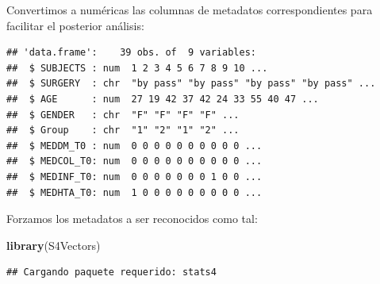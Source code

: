 \documentclass[
]{article}
\newenvironment{Shaded}{\begin{snugshade}}{\end{snugshade}}
\newcommand{\FunctionTok}[1]{\textcolor[rgb]{0.13,0.29,0.53}{\textbf{#1}}}
\newcommand{\NormalTok}[1]{#1}
\newcommand{\OtherTok}[1]{\textcolor[rgb]{0.56,0.35,0.01}{#1}}
\newcommand{\SpecialCharTok}[1]{\textcolor[rgb]{0.81,0.36,0.00}{\textbf{#1}}}
\begin{document}
Convertimos a numéricas las columnas de metadatos correspondientes para
facilitar el posterior análisis:

\begin{Shaded}
\end{Shaded}

\begin{verbatim}
## 'data.frame':    39 obs. of  9 variables:
##  $ SUBJECTS : num  1 2 3 4 5 6 7 8 9 10 ...
##  $ SURGERY  : chr  "by pass" "by pass" "by pass" "by pass" ...
##  $ AGE      : num  27 19 42 37 42 24 33 55 40 47 ...
##  $ GENDER   : chr  "F" "F" "F" "F" ...
##  $ Group    : chr  "1" "2" "1" "2" ...
##  $ MEDDM_T0 : num  0 0 0 0 0 0 0 0 0 0 ...
##  $ MEDCOL_T0: num  0 0 0 0 0 0 0 0 0 0 ...
##  $ MEDINF_T0: num  0 0 0 0 0 0 0 1 0 0 ...
##  $ MEDHTA_T0: num  1 0 0 0 0 0 0 0 0 0 ...
\end{verbatim}

Forzamos los metadatos a ser reconocidos como tal:

\begin{Shaded}
\begin{Highlighting}[]
\FunctionTok{library}\NormalTok{(S4Vectors)}
\end{Highlighting}
\end{Shaded}

\begin{verbatim}
## Cargando paquete requerido: stats4
\end{verbatim}
\end{document}
